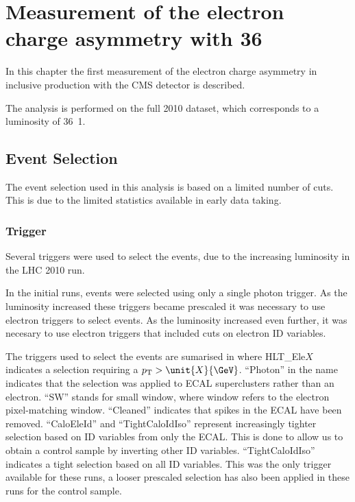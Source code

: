 \chapter{ 
Measurement of the electron charge asymmetry with \unit{36}{\invpb} }

In this chapter the first measurement of the electron charge asymmetry in
inclusive \inclusiveWe production with the \ac{CMS} detector is described.

The analysis is performed on the full 2010 dataset, which corresponds to a
luminosity of \unit{36.1}{\invpb}.

\section{Event Selection}

The event selection used in this analysis is based on a limited number of cuts.
This is due to the limited statistics available in early data taking.

\subsection{Trigger}

Several triggers were used to select the events, due to the increasing
luminosity in the \ac{LHC} 2010 run.

In the initial runs, events were selected using only a single photon trigger. 
As the luminosity increased these triggers became prescaled it was
necessary to use electron triggers to select events. 
As the luminosity increased even further, it was necesary to use electron
triggers that included cuts on electron ID variables.

The triggers used to select the events are sumarised in 
where HLT\_Ele$X$ indicates a selection requiring a $\Pt > \unit{X}{\GeV}$. 
``Photon'' in the name indicates that the selection was applied to ECAL
superclusters rather than an electron. 
``SW'' stands for small window, where window refers to the electron
pixel-matching window. 
 ``Cleaned'' indicates that spikes in the \ac{ECAL} have been removed. 
``CaloEleId'' and ``TightCaloIdIso'' represent increasingly tighter selection
based on ID variables from only the \ac{ECAL}.  This is done to allow us to
obtain a control sample by inverting other ID variables.
``TightCaloIdIso'' indicates a tight selection based on all ID variables. 
This was the only trigger available for these runs, a looser prescaled
selection has also been applied in these runs for the control sample.

